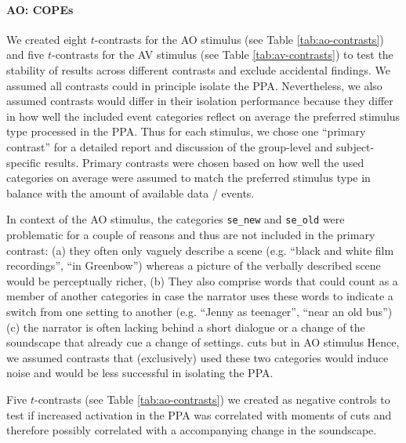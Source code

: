 \documentclass[english]{article}
\begin{document}
\paragraph{AO: COPEs}


We created eight $t$-contrasts for the AO stimulus (see Table
\ref{tab:ao-contrasts}) and five $t$-contrasts for the AV stimulus (see Table
\ref{tab:av-contrasts}) to test the stability of results across different
contrasts and exclude accidental  findings.
We assumed all contrasts could in principle isolate the PPA. Nevertheless, we
also assumed contrasts would differ in their isolation performance because they
differ in how well the included event categories reflect on average the
preferred stimulus type processed in the PPA.
Thus for each stimulus, we chose one ``primary contrast'' for a detailed report
and discussion of the group-level and subject-specific results. Primary
contrasts were chosen based on how well the used categories on average were
assumed to match the preferred stimulus type in balance with the amount of
available data / events.

In context of the AO stimulus, the categories \texttt{se\_new} and
\texttt{se\_old} were problematic for a couple of reasons and thus are not
included in the primary contrast:
(a) they often only vaguely describe a scene (e.g. ``black and white film
recordings'', ``in Greenbow'') whereas a picture of the verbally described scene
would be perceptually richer,
(b) They also comprise words that could count as a member of another categories
in case the narrator uses these words to indicate a switch from one setting to
another (e.g. ``Jenny as teenager'', ``near an old bus'')
(c) the narrator is often lacking behind a short dialogue or a change of the
soundscape that already cue a change of settings.
cuts but in AO stimulus
Hence, we assumed contrasts that (exclusively) used these two categories would
induce noise and would be less successful in isolating the PPA.

Five $t$-contrasts (see Table \ref{tab:ao-contrasts}) we created as negative
controls to test if increased activation in the PPA was correlated with
moments of cuts and therefore possibly correlated with a accompanying change in
the soundscape.
\end{document}
